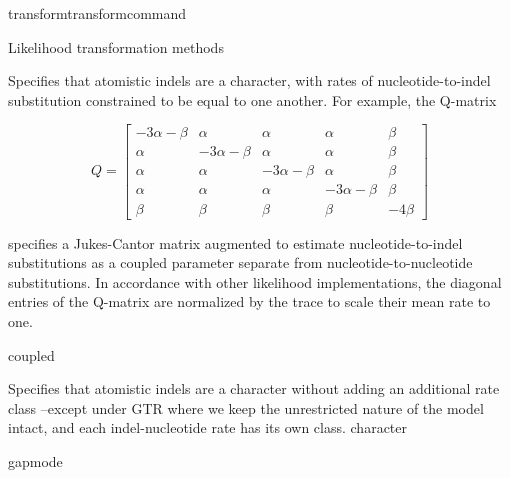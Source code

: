 \begin{command}{transform}{transformcommand}
\begin{arguments}
\begin{argumentgroup}{Likelihood transformation methods}
{\begin{description}
                            {Specifies that atomistic indels are a character,
                            with rates of nucleotide-to-indel substitution
                            constrained to be equal to one another. For example,
                            the Q-matrix

                            \begin{equation*}
                                Q =
                                    \begin{bmatrix}
                                        -3 \alpha - \beta & \alpha & \alpha & \alpha & \beta \\
                                        \alpha & -3 \alpha - \beta & \alpha & \alpha & \beta \\
                                        \alpha & \alpha & -3 \alpha - \beta & \alpha & \beta \\
                                        \alpha & \alpha & \alpha & -3 \alpha - \beta & \beta \\
                                        \beta & \beta & \beta & \beta & -4 \beta
                                \end{bmatrix}
                            \end{equation*}

                            specifies a Jukes-Cantor matrix augmented to
                            estimate nucleotide-to-indel substitutions as a
                            coupled parameter separate from
                            nucleotide-to-nucleotide substitutions. In
                            accordance with other likelihood implementations,
                            the diagonal entries of the Q-matrix are normalized
                            by the trace to scale their mean rate to one.}
                            {coupled}

                            {Specifies that atomistic indels are a character
                            without adding an additional rate class --except
                            under GTR where we keep the unrestricted nature of the
                            model intact, and each indel-nucleotide rate has its
                            own class.}
                            {character}

                    \end{description}}
                {gapmode}


\end{argumentgroup}
\end{arguments}
\end{command}
